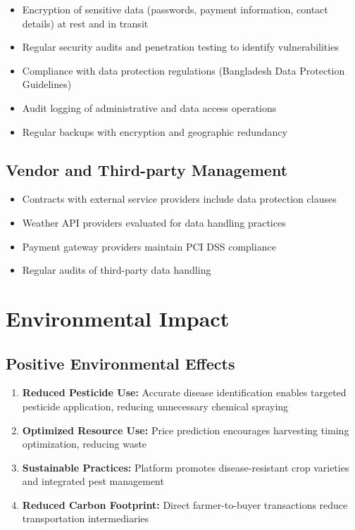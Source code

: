\documentclass[12pt,a4paper]{report}
\begin{document}
\begin{itemize}
    \item Encryption of sensitive data (passwords, payment information, contact details) at rest and in transit
    \item Regular security audits and penetration testing to identify vulnerabilities
    \item Compliance with data protection regulations (Bangladesh Data Protection Guidelines)
    \item Audit logging of administrative and data access operations
    \item Regular backups with encryption and geographic redundancy
\end{itemize}

\subsection{Vendor and Third-party Management}

\begin{itemize}
    \item Contracts with external service providers include data protection clauses
    \item Weather API providers evaluated for data handling practices
    \item Payment gateway providers maintain PCI DSS compliance
    \item Regular audits of third-party data handling
\end{itemize}

\section{Environmental Impact}

\subsection{Positive Environmental Effects}

\begin{enumerate}
    \item \textbf{Reduced Pesticide Use:} Accurate disease identification enables targeted pesticide application, reducing unnecessary chemical spraying
    \item \textbf{Optimized Resource Use:} Price prediction encourages harvesting timing optimization, reducing waste
    \item \textbf{Sustainable Practices:} Platform promotes disease-resistant crop varieties and integrated pest management
    \item \textbf{Reduced Carbon Footprint:} Direct farmer-to-buyer transactions reduce transportation intermediaries
\end{enumerate}
\end{document}
